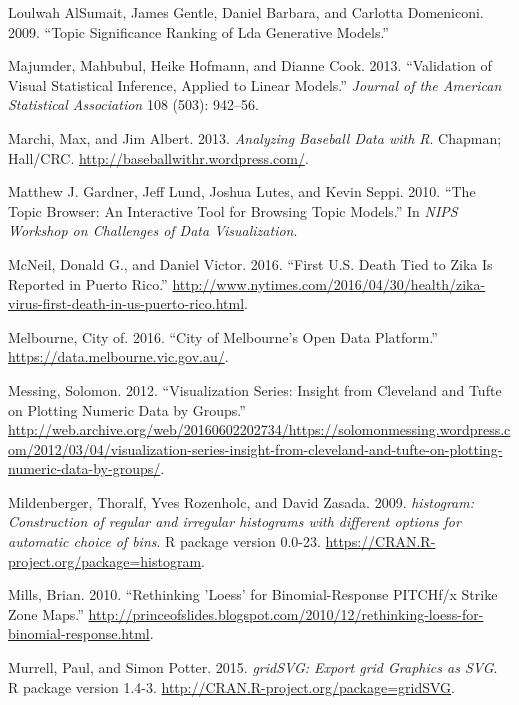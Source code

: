 \documentclass[12pt,]{isuthesis}
\begin{document}
\hypertarget{ref-AlSumait}{}
Loulwah AlSumait, James Gentle, Daniel Barbara, and Carlotta Domeniconi.
2009. ``Topic Significance Ranking of Lda Generative Models.''

\hypertarget{ref-Majumder:2013ie}{}
Majumder, Mahbubul, Heike Hofmann, and Dianne Cook. 2013. ``Validation
of Visual Statistical Inference, Applied to Linear Models.''
\emph{Journal of the American Statistical Association} 108 (503):
942--56.

\hypertarget{ref-baseball}{}
Marchi, Max, and Jim Albert. 2013. \emph{Analyzing Baseball Data with
R}. Chapman; Hall/CRC. \url{http://baseballwithr.wordpress.com/}.

\hypertarget{ref-Gardner}{}
Matthew J. Gardner, Jeff Lund, Joshua Lutes, and Kevin Seppi. 2010.
``The Topic Browser: An Interactive Tool for Browsing Topic Models.'' In
\emph{NIPS Workshop on Challenges of Data Visualization}.

\hypertarget{ref-zika-nyt}{}
McNeil, Donald G., and Daniel Victor. 2016. ``First U.S. Death Tied to
Zika Is Reported in Puerto Rico.''
\url{http://www.nytimes.com/2016/04/30/health/zika-virus-first-death-in-us-puerto-rico.html}.

\hypertarget{ref-melbourne}{}
Melbourne, City of. 2016. ``City of Melbourne's Open Data Platform.''
\url{https://data.melbourne.vic.gov.au/}.

\hypertarget{ref-messing}{}
Messing, Solomon. 2012. ``Visualization Series: Insight from Cleveland
and Tufte on Plotting Numeric Data by Groups.''
\url{http://web.archive.org/web/20160602202734/https://solomonmessing.wordpress.com/2012/03/04/visualization-series-insight-from-cleveland-and-tufte-on-plotting-numeric-data-by-groups/}.

\hypertarget{ref-histogram}{}
Mildenberger, Thoralf, Yves Rozenholc, and David Zasada. 2009.
\emph{histogram: Construction of regular and irregular histograms with
different options for automatic choice of bins}. R package version
0.0-23. \url{https://CRAN.R-project.org/package=histogram}.

\hypertarget{ref-loess}{}
Mills, Brian. 2010. ``Rethinking 'Loess' for Binomial-Response PITCHf/x
Strike Zone Maps.''
\url{http://princeofslides.blogspot.com/2010/12/rethinking-loess-for-binomial-response.html}.

\hypertarget{ref-gridSVG}{}
Murrell, Paul, and Simon Potter. 2015. \emph{gridSVG: Export grid
Graphics as SVG}. R package version 1.4-3.
\url{http://CRAN.R-project.org/package=gridSVG}.
\end{document}
